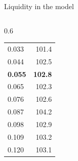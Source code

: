 \begin{frame}{Liquidity in the model}
\begin{columns}[T]
\begin{column}{0.6\textwidth}
\begin{tabular}{lr}
          0.033 & 101.4 \\
          0.044 & 102.5 \\
          \textbf{0.055} & \textbf{102.8} \\
          0.065 & 102.3 \\
          0.076 & 102.6 \\
          0.087 & 104.2 \\
          0.098 & 102.9 \\
          0.109 & 103.2 \\
          0.120 & 103.1 \\
        \bottomrule
      \end{tabular}
    \end{column}
  \end{columns}
\end{frame}

